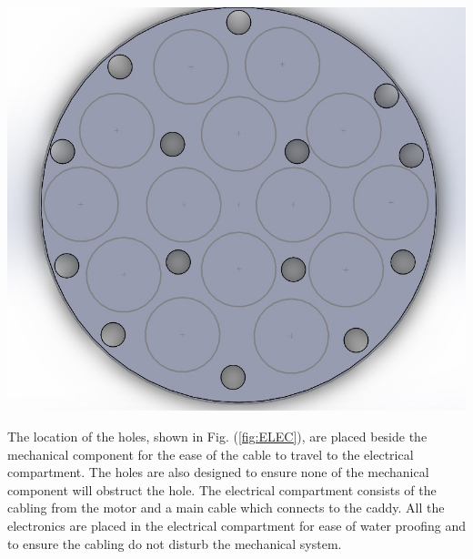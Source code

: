 \documentclass[11pt,landscape]{article}
\newenvironment{Figure}
  {\par\medskip\noindent\minipage{\linewidth}}
  {\endminipage\par\medskip}
\begin{document}
\begin{multicols}{3}
    \begin{Figure}
        \begin{center}
            \includegraphics[width=\textwidth]{Figure9.jpg}
            \label{fig:ELEC}
        \end{center}
    \end{Figure}

    The location of the holes, shown in Fig. (\ref{fig:ELEC}), are placed beside the
    mechanical component for the ease of the cable to travel to the electrical
    compartment. The holes are also designed to ensure none of the mechanical
    component will obstruct the hole. The electrical compartment consists of the
    cabling from the motor and a main cable which connects to the caddy. All the
    electronics are placed in the electrical compartment for ease of water
    proofing and to ensure the cabling do not disturb the mechanical system. 
    

\end{multicols}
\end{document}
